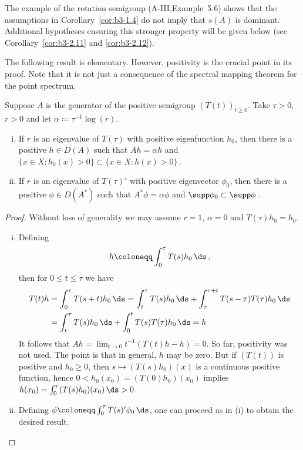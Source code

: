 The example of the rotation semigroup (A-III,Example~5.6) shows that the assumptions in Corollary~\ref{cor:b3-1.4} do not imply that $s(A)$ is dominant.
Additional hypotheses ensuring this stronger property will be given below (see Corollary~\ref{cor:b3-2.11} and \ref{cor:b3-2.12}).

The following result is elementary. However, positivity is the crucial point in its proof. 	
Note that it is not just a consequence of the spectral mapping theorem for the point spectrum.
\begin{proposition}\label{prop:b3-1.5}
Suppose $A$ is the generator of the positive semigroup $(T(t))_{t \geq 0}$.
Take $\tau > 0$, $r > 0$ and let $\alpha \coloneqq \tau^{-1}\log(r)$.
\begin{enumerate}[(i)]
\item 
If $r$ is an eigenvalue of $T(\tau)$ with positive eigenfunction $h_{0}$, then there is a positive $h \in D(A)$ such that $Ah = \alpha h$ and $\{x \in X \colon h_{0}(x) > 0\} \subset \{x \in X \colon h(x) > 0\}$\,.
		
\item 
If $r$ is an eigenvalue of $T(\tau)'$ with positive eigenvector $\phi_{0}$, then there is a positive $\phi \in D(A^*)$ such that $A^*\phi = \alpha\phi$ and $\supp\phi_{0} \subset \supp\phi$\,.
	\end{enumerate}
\end{proposition}
%	
\begin{proof}
	Without loss of generality we may assume $r = 1$, \ie $\alpha = 0$ and $T(\tau)h_{0} = h_{0}$.
	\begin{enumerate}[(i), wide]
    \item 
	Defining
	\begin{equation}\label{eq:b3-1.14}
		h \coloneqq \int_{0}^{\tau} T(s)h_{0} \, \ds \,,
	\end{equation}
	then for $0 \leq t \leq \tau$ we have
	\begin{align*}
		T(t)h &= \int_{0}^{\tau} T(s+t)h_{0} \, \ds  = \int_{t}^{\tau} T(s)h_{0} \, \ds  + \int_{\tau}^{\tau+t} T(s-\tau)T(\tau)h_{0} \, \ds  \\
		&= \int_{t}^{\tau} T(s)h_{0} \, \ds  + \int_{0}^{t} T(s)T(\tau)h_{0} \, \ds  = h
	\end{align*}
	It follows that $Ah = \lim_{t \to 0} t^{-1}(T(t)h - h) = 0$.
	So far, positivity was not used. The point is that in general, $h$ may be zero.
	But if $(T(t))$ is positive and $h_{0} \geq 0$, then $s \mapsto (T(s)h_{0})(x)$ is a continuous positive function, hence $0 < h_{0}(x_{0}) = (T(0)h_{0})(x_{0})$ implies $h(x_{0}) = \int_{0}^{\tau} (T(s)h_{0})(x_{0}) \, \ds  > 0$.
	
	\item 
	Defining $\phi \coloneqq \int_{0}^{\tau} T(s)'\phi_{0} \, \ds $, one can proceed as in (i) to obtain the desired result.
	\end{enumerate}
\end{proof}
